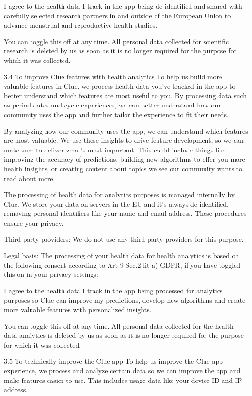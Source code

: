 I agree to the health data I track in the app being de-identified and shared with carefully selected research partners in and outside of the European Union to advance menstrual and reproductive health studies.

You can toggle this off at any time. All personal data collected for scientific research is deleted by us as soon as it is no longer required for the purpose for which it was collected.

3.4 To improve Clue features with health analytics
To help us build more valuable features in Clue, we process health data you’ve tracked in the app to better understand which features are most useful to you. By processing data such as period dates and cycle experiences, we can better understand how our community uses the app and further tailor the experience to fit their needs.

By analyzing how our community uses the app, we can understand which features are most valuable. We use these insights to drive feature development, so we can make sure to deliver what’s most important. This could include things like improving the accuracy of predictions, building new algorithms to offer you more health insights, or creating content about topics we see our community wants to read about more.

The processing of health data for analytics purposes is managed internally by Clue. We store your data on servers in the EU and it’s always de-identified, removing personal identifiers like your name and email address. These procedures ensure your privacy.

Third party providers: We do not use any third party providers for this purpose.

Legal basis: The processing of your health data for health analytics is based on the following consent according to Art 9 Sec.2 lit a) GDPR, if you have toggled this on in your privacy settings:

I agree to the health data I track in the app being processed for analytics purposes so Clue can improve my predictions, develop new algorithms and create more valuable features with personalized insights.

You can toggle this off at any time. All personal data collected for the health data analytics is deleted by us as soon as it is no longer required for the purpose for which it was collected.

3.5 To technically improve the Clue app
To help us improve the Clue app experience, we process and analyze certain data so we can improve the app and make features easier to use. This includes usage data like your device ID and IP address.

